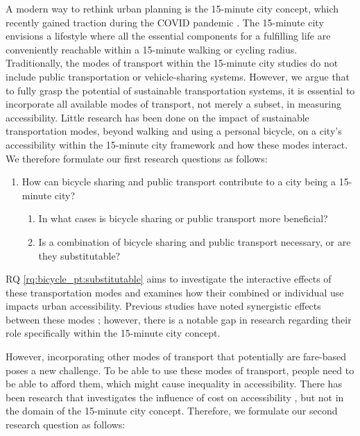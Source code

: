 A modern way to rethink urban planning is the 15-minute city concept, which recently gained traction during the COVID pandemic .
The 15-minute city envisions a lifestyle where all the essential components for a fulfilling life are conveniently reachable within a 15-minute walking or cycling radius.
Traditionally, the modes of transport within the 15-minute city studies do not include public transportation or vehicle-sharing systems.
However, we argue that to fully grasp the potential of sustainable transportation systems, it is essential to incorporate all available modes of transport, not merely a subset, in measuring accessibility.
Little research has been done on the impact of sustainable transportation modes, beyond walking and using a personal bicycle, on a city's accessibility within the 15-minute city framework and how these modes interact.
We therefore formulate our first research questions as follows:
\begin{enumerate}
  \renewcommand{\labelenumi}{RQ \theenumi.}
  \item How can bicycle sharing and public transport contribute to a city being a 15-minute city?
  \label{rq:bicycle_pt}
  \begin{enumerate}
    \item In what cases is bicycle sharing or public transport more beneficial?
    \label{rq:bicycle_pt:beneficial}
    \item Is a combination of bicycle sharing and public transport necessary, or are they substitutable?
    \label{rq:bicycle_pt:substitutable}
  \end{enumerate}
\end{enumerate}
RQ \ref{rq:bicycle_pt:substitutable} aims to investigate the interactive effects of these transportation modes and examines how their combined or individual use impacts urban accessibility. 
Previous studies have noted synergistic effects between these modes ; however, there is a notable gap in research regarding their role specifically within the 15-minute city concept.

However, incorporating other modes of transport that potentially are fare-based poses a new challenge.
To be able to use these modes of transport, people need to be able to afford them, which might cause inequality in accessibility.
There has been research that investigates the influence of cost on accessibility , but not in the domain of the 15-minute city concept.
Therefore, we formulate our second research question as follows:

